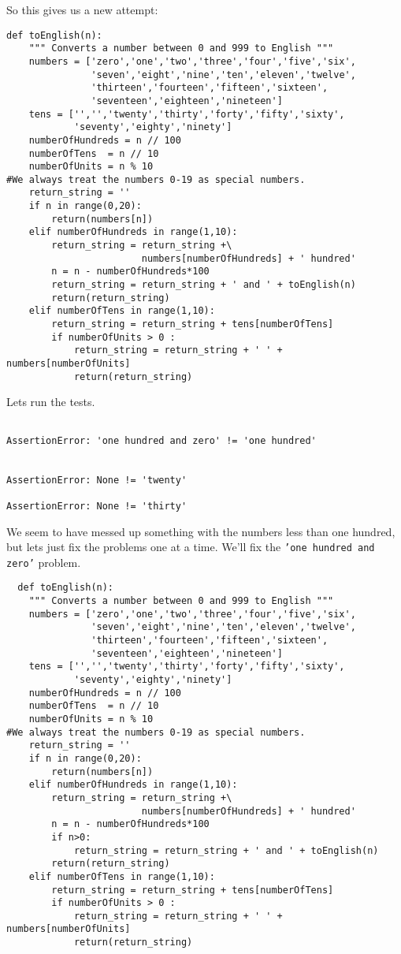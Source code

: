 \documentclass{paper}
\begin{document}
So this gives us a new attempt:
\begin{lstlisting}
def toEnglish(n):
    """ Converts a number between 0 and 999 to English """
    numbers = ['zero','one','two','three','four','five','six',
               'seven','eight','nine','ten','eleven','twelve',
               'thirteen','fourteen','fifteen','sixteen',
               'seventeen','eighteen','nineteen']
    tens = ['','','twenty','thirty','forty','fifty','sixty',
            'seventy','eighty','ninety']
    numberOfHundreds = n // 100
    numberOfTens  = n // 10
    numberOfUnits = n % 10
#We always treat the numbers 0-19 as special numbers.
    return_string = ''
    if n in range(0,20):
        return(numbers[n])
    elif numberOfHundreds in range(1,10):
        return_string = return_string +\
                        numbers[numberOfHundreds] + ' hundred'
        n = n - numberOfHundreds*100
        return_string = return_string + ' and ' + toEnglish(n)
        return(return_string)
    elif numberOfTens in range(1,10):
        return_string = return_string + tens[numberOfTens]
        if numberOfUnits > 0 :
            return_string = return_string + ' ' + numbers[numberOfUnits]
            return(return_string)
  \end{lstlisting}
Lets run the tests.
\begin{verbatim}

AssertionError: 'one hundred and zero' != 'one hundred'


AssertionError: None != 'twenty'

AssertionError: None != 'thirty'
\end{verbatim}
We seem to have messed up something with the numbers less than one
hundred, but lets just fix the problems one at a time. We'll fix the
{\tt 'one hundred and zero'} problem.
\begin{lstlisting}
  def toEnglish(n):
    """ Converts a number between 0 and 999 to English """
    numbers = ['zero','one','two','three','four','five','six',
               'seven','eight','nine','ten','eleven','twelve',
               'thirteen','fourteen','fifteen','sixteen',
               'seventeen','eighteen','nineteen']
    tens = ['','','twenty','thirty','forty','fifty','sixty',
            'seventy','eighty','ninety']
    numberOfHundreds = n // 100
    numberOfTens  = n // 10
    numberOfUnits = n % 10
#We always treat the numbers 0-19 as special numbers.
    return_string = ''
    if n in range(0,20):
        return(numbers[n])
    elif numberOfHundreds in range(1,10):
        return_string = return_string +\
                        numbers[numberOfHundreds] + ' hundred'
        n = n - numberOfHundreds*100
        if n>0:
            return_string = return_string + ' and ' + toEnglish(n)
        return(return_string)
    elif numberOfTens in range(1,10):
        return_string = return_string + tens[numberOfTens]
        if numberOfUnits > 0 :
            return_string = return_string + ' ' + numbers[numberOfUnits]
            return(return_string)
\end{lstlisting}
\end{document}
